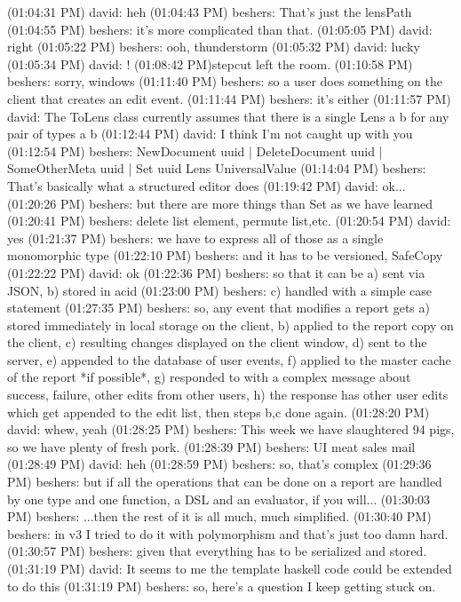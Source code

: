 (01:04:31 PM) david: heh
(01:04:43 PM) beshers: That's just the lensPath
(01:04:55 PM) beshers: it's more complicated than that.
(01:05:05 PM) david: right
(01:05:22 PM) beshers: ooh, thunderstorm
(01:05:32 PM) david: lucky
(01:05:34 PM) david: !
(01:08:42 PM)stepcut left the room.
(01:10:58 PM) beshers: sorry, windows
(01:11:40 PM) beshers: so a user does something on the client that creates an
edit event.
(01:11:44 PM) beshers: it's either
(01:11:57 PM) david: The ToLens class currently assumes that there is a single
Lens a b for any pair of types a b
(01:12:44 PM) david: I think I'm not caught up with you
(01:12:54 PM) beshers: NewDocument uuid | DeleteDocument uuid | SomeOtherMeta
uuid | Set uuid Lens UniversalValue
(01:14:04 PM) beshers: That's basically what a structured editor does
(01:19:42 PM) david: ok...
(01:20:26 PM) beshers: but there are more things than Set as we have learned
(01:20:41 PM) beshers: delete list element, permute list,etc.
(01:20:54 PM) david: yes
(01:21:37 PM) beshers: we have to express all of those as a single monomorphic
type
(01:22:10 PM) beshers: and it has to be versioned, SafeCopy
(01:22:22 PM) david: ok
(01:22:36 PM) beshers: so that it can be a) sent via JSON, b) stored in acid
(01:23:00 PM) beshers: c) handled with a simple case statement
(01:27:35 PM) beshers: so, any event that modifies a report gets a) stored
immediately in local storage on the client, b) applied to the report copy on
the client, c) resulting changes displayed on the client window, d) sent to the
server, e) appended to the database of user events, f) applied to the master
cache of the report *if possible*, g) responded to with a complex message about
success, failure, other edits from other users, h) the response has other user
edits which get appended to the edit list, then steps b,c done again.
(01:28:20 PM) david: whew, yeah
(01:28:25 PM) beshers: This week we have slaughtered 94 pigs, so we have plenty
of fresh pork.
(01:28:39 PM) beshers: UI meat sales mail
(01:28:49 PM) david: heh
(01:28:59 PM) beshers: so, that's complex
(01:29:36 PM) beshers: but if all the operations that can be done on a report
are handled by one type and one function, a DSL and an evaluator, if you
will...
(01:30:03 PM) beshers: ...then the rest of it is all much, much simplified.
(01:30:40 PM) beshers: in v3 I tried to do it with polymorphism and that's just
too damn hard.
(01:30:57 PM) beshers: given that everything has to be serialized and stored.
(01:31:19 PM) david: It seems to me the template haskell code could be extended
to do this
(01:31:19 PM) beshers: so, here's a question I keep getting stuck on.
